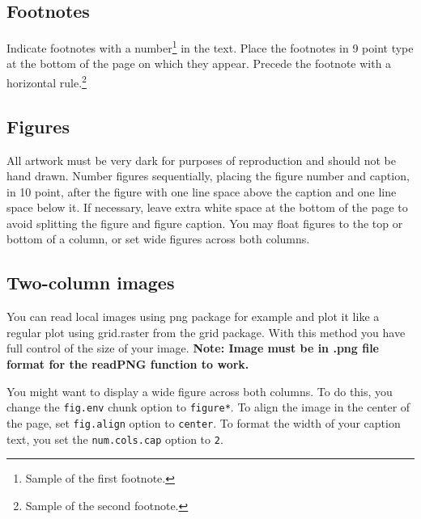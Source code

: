 \documentclass[10pt, letterpaper]{article}
\begin{document}
\subsection{Footnotes}\label{footnotes}

Indicate footnotes with a number\footnote{Sample of the first
footnote.} in the text. Place the footnotes in 9 point type at the
bottom of the page on which they appear. Precede the footnote with a
horizontal rule.\footnote{Sample of the second footnote.}

\subsection{Figures}\label{figures}

All artwork must be very dark for purposes of reproduction and should
not be hand drawn. Number figures sequentially, placing the figure
number and caption, in 10 point, after the figure with one line space
above the caption and one line space below it. If necessary, leave extra
white space at the bottom of the page to avoid splitting the figure and
figure caption. You may float figures to the top or bottom of a column,
or set wide figures across both columns.

\subsection{Two-column images}\label{two-column-images}

You can read local images using png package for example and plot it like
a regular plot using grid.raster from the grid package. With this method
you have full control of the size of your image. \textbf{Note: Image
must be in .png file format for the readPNG function to work.}

You might want to display a wide figure across both columns. To do this,
you change the \texttt{fig.env} chunk option to \texttt{figure*}. To
align the image in the center of the page, set \texttt{fig.align} option
to \texttt{center}. To format the width of your caption text, you set
the \texttt{num.cols.cap} option to \texttt{2}.
\end{document}
